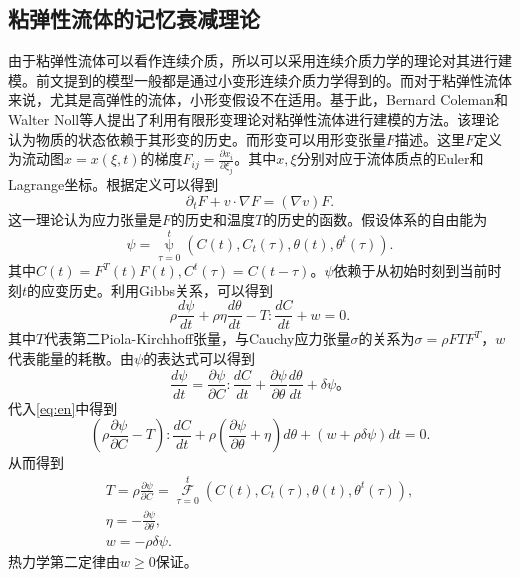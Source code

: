 \subsection{粘弹性流体的记忆衰减理论}
由于粘弹性流体可以看作连续介质，所以可以采用连续介质力学的理论对其进行建模。前文提到的模型一般都是通过小变形连续介质力学得到的。而对于粘弹性流体来说，尤其是高弹性的流体，小形变假设不在适用。基于此，Bernard Coleman和Walter Noll等人提出了利用有限形变理论对粘弹性流体进行建模的方法\cite{coleman1961foundations,coleman1964thermodynamics,coleman2012viscometric}。该理论认为物质的状态依赖于其形变的历史。而形变可以用形变张量$F$描述。这里$F$定义为流动图$x = x(\xi,t)$的梯度$F_{ij} = \frac{\partial x_i}{\partial \xi_j}$。其中$x,\xi$分别对应于流体质点的Euler和Lagrange坐标。根据定义可以得到
\begin{equation}\label{eq:Feq}
	\partial_t F + v \cdot \nabla F = (\nabla v) F.
\end{equation}
这一理论认为应力张量是$F$的历史和温度$T$的历史的函数。假设体系的自由能为
\begin{equation*}
	\psi = \mathop{\psi} \limits_{\tau=0}^{t}( C(t), C_t(\tau),\theta(t),\theta^t(\tau)).
\end{equation*}
其中$C(t) = F^T(t) F(t),C^t(\tau) = C(t - \tau)$。$\psi$依赖于从初始时刻到当前时刻$t$的应变历史。利用Gibbs关系，可以得到
\begin{equation}\label{eq:en}
	\rho \frac{d\psi}{dt} + \rho \eta \frac{d \theta}{dt} - T: \frac{dC}{dt} + w = 0.
\end{equation}
其中$T$代表第二Piola-Kirchhoff张量，与Cauchy应力张量$\sigma$的关系为$\sigma = \rho F T F^T$，$w$代表能量的耗散。由$\psi$的表达式可以得到
\begin{equation*}
	\frac{d\psi}{dt} = \frac{\partial \psi}{\partial C} : \frac{d C}{dt}+ \frac{\partial \psi}{\partial \theta} \frac{d\theta}{dt} + \delta \psi。
\end{equation*}
代入\eqref{eq:en}中得到
\begin{equation*}
	(\rho \frac{\partial \psi}{\partial C} - T) : \frac{dC}{dt} + \rho (\frac{\partial \psi}{\partial \theta} + \eta) d\theta + (w + \rho \delta \psi) dt  =0.
\end{equation*}
从而得到
\begin{eqnarray*}
	T = \rho \frac{\partial \psi}{\partial C} = \mathop{\mathcal{F}}\limits_{\tau=0}^{t} ( C(t), C_t(\tau),\theta(t),\theta^t(\tau)), \\
	\eta = -\frac{\partial \psi}{\partial \theta},\\
	w = -\rho \delta \psi.
\end{eqnarray*}
热力学第二定律由$w \ge 0$保证\cite{coleman1961foundations,dimitrienko2010nonlinear}。

